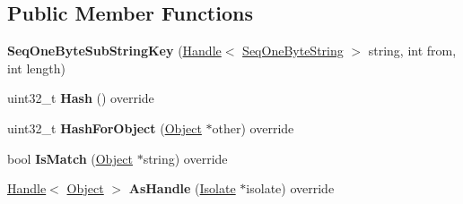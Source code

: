 \subsection*{Public Member Functions}
\begin{DoxyCompactItemize}
\item 
{\bfseries Seq\+One\+Byte\+Sub\+String\+Key} (\hyperlink{classv8_1_1internal_1_1_handle}{Handle}$<$ \hyperlink{classv8_1_1internal_1_1_seq_one_byte_string}{Seq\+One\+Byte\+String} $>$ string, int from, int length)\hypertarget{classv8_1_1internal_1_1_seq_one_byte_sub_string_key_a8295057ff259b35b15188a4955347c45}{}\label{classv8_1_1internal_1_1_seq_one_byte_sub_string_key_a8295057ff259b35b15188a4955347c45}

\item 
uint32\+\_\+t {\bfseries Hash} () override\hypertarget{classv8_1_1internal_1_1_seq_one_byte_sub_string_key_ad181af19d0a33960c16974be5e23bc33}{}\label{classv8_1_1internal_1_1_seq_one_byte_sub_string_key_ad181af19d0a33960c16974be5e23bc33}

\item 
uint32\+\_\+t {\bfseries Hash\+For\+Object} (\hyperlink{classv8_1_1internal_1_1_object}{Object} $\ast$other) override\hypertarget{classv8_1_1internal_1_1_seq_one_byte_sub_string_key_acdde5f141a128aa3e4fbb498c5f75cfe}{}\label{classv8_1_1internal_1_1_seq_one_byte_sub_string_key_acdde5f141a128aa3e4fbb498c5f75cfe}

\item 
bool {\bfseries Is\+Match} (\hyperlink{classv8_1_1internal_1_1_object}{Object} $\ast$string) override\hypertarget{classv8_1_1internal_1_1_seq_one_byte_sub_string_key_a5c32078a90f57116e430947d99c2fce4}{}\label{classv8_1_1internal_1_1_seq_one_byte_sub_string_key_a5c32078a90f57116e430947d99c2fce4}

\item 
\hyperlink{classv8_1_1internal_1_1_handle}{Handle}$<$ \hyperlink{classv8_1_1internal_1_1_object}{Object} $>$ {\bfseries As\+Handle} (\hyperlink{classv8_1_1internal_1_1_isolate}{Isolate} $\ast$isolate) override\hypertarget{classv8_1_1internal_1_1_seq_one_byte_sub_string_key_acb24186021ffb56ca5db33638f5daa44}{}\label{classv8_1_1internal_1_1_seq_one_byte_sub_string_key_acb24186021ffb56ca5db33638f5daa44}

\end{DoxyCompactItemize}
